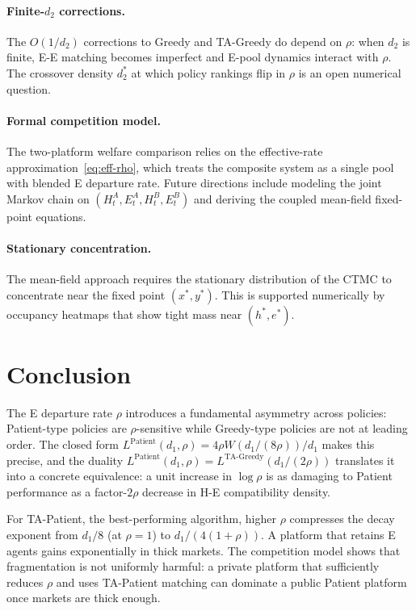 \documentclass{article}
\theoremstyle{plain}
\theoremstyle{definition}
\begin{document}
\paragraph{Finite-$d_2$ corrections.}
The $O(1/d_2)$ corrections to Greedy and TA-Greedy do depend on $\rho$:
when $d_2$ is finite, E-E matching becomes imperfect and E-pool dynamics
interact with $\rho$.  The crossover density $d_2^*$ at which policy
rankings flip in $\rho$ is an open numerical question.

\paragraph{Formal competition model.}
The two-platform welfare comparison relies on the effective-rate
approximation~\eqref{eq:eff-rho}, which treats the composite system as a
single pool with blended E departure rate.  Future directions include modeling
the joint Markov chain on $(H_t^A,E_t^A,H_t^B,E_t^B)$ and deriving the coupled
mean-field fixed-point equations.

\paragraph{Stationary concentration.}
The mean-field approach requires the stationary distribution of the CTMC to
concentrate near the fixed point $(x^*,y^*)$.  This is supported numerically
by occupancy heatmaps that show tight mass near $(h^*,e^*)$.

\section{Conclusion}
\label{sec:conclusion}

The E departure rate $\rho$ introduces a fundamental asymmetry across
policies: Patient-type policies are $\rho$-sensitive while Greedy-type
policies are not at leading order.  The closed form
$L^{\mathrm{Patient}}(d_1,\rho)=4\rho W(d_1/(8\rho))/d_1$ makes this
precise, and the duality $L^{\mathrm{Patient}}(d_1,\rho)=L^{\mathrm{TA\text{-}Greedy}}(d_1/(2\rho))$
translates it into a concrete equivalence: a unit increase in $\log\rho$ is
as damaging to Patient performance as a factor-$2\rho$ decrease in H-E
compatibility density.

For TA-Patient, the best-performing algorithm, higher $\rho$ compresses
the decay exponent from $d_1/8$ (at $\rho=1$) to $d_1/(4(1+\rho))$.  A
platform that retains E agents gains exponentially in thick markets.  The
competition model shows that fragmentation is not uniformly harmful: a
private platform that sufficiently reduces $\rho$ and uses TA-Patient matching
can dominate a public Patient platform once markets are thick enough.
\end{document}
